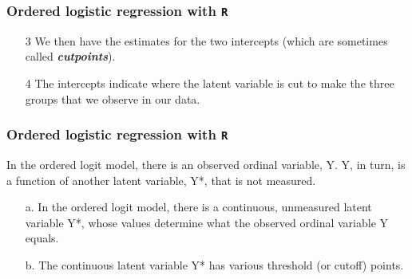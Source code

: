 \documentclass[00-GLMregslides.tex]{subfiles}
\begin{document}
\begin{frame}
\frametitle{Ordered logistic regression with \texttt{R} }
	\Large
\begin{itemize}
\item[3]	
We then have the estimates for the two intercepts (which are sometimes called \textbf{\textit{cutpoints}}). 
\item[4] The intercepts indicate where the latent variable is cut to make the three groups that we observe in our data. 
\end{itemize}
\end{frame}


\begin{frame}
\frametitle{Ordered logistic regression with \texttt{R} }
\Large

In the ordered logit model, there is an observed ordinal variable, Y.
Y, in turn, is a function of another latent variable, Y*, that is not measured.

\begin{itemize}
\item[a.] In the ordered logit model, there is a continuous, unmeasured latent variable Y*,
whose values determine what the observed ordinal variable Y equals.
\item[b.] The continuous latent variable Y* has various threshold (or cutoff) points. 
\end{itemize}
\end{frame}
\end{document}
